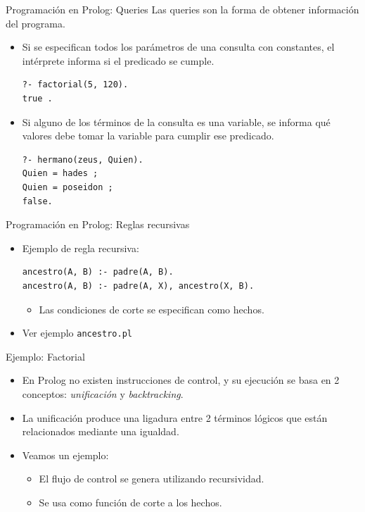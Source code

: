 \documentclass[xcolor=dvipsnames]{beamer}
\begin{document}
\begin{frame}[fragile]{Programación en Prolog: Queries}
    Las queries son la forma de obtener información del programa.
    \begin{itemize}
        \item Si se especifican todos los parámetros de una consulta con constantes, el intérprete informa si el predicado se cumple.
        \begin{lstlisting}
?- factorial(5, 120).
true .
        \end{lstlisting} 
        \item Si alguno de los términos de la consulta es una variable, se informa qué valores debe tomar la variable para cumplir ese predicado.
        \begin{lstlisting}
?- hermano(zeus, Quien).
Quien = hades ;
Quien = poseidon ;
false.
        \end{lstlisting} 
    \end{itemize}
\end{frame}

\begin{frame}[fragile]{Programación en Prolog: Reglas recursivas}
    \begin{itemize}
        \item Ejemplo de regla recursiva:
        \begin{lstlisting}
ancestro(A, B) :- padre(A, B).
ancestro(A, B) :- padre(A, X), ancestro(X, B).
        \end{lstlisting} 
        \begin{itemize}
            \item Las condiciones de corte se especifican como hechos.
        \end{itemize}
        \item Ver ejemplo \verb|ancestro.pl|
    \end{itemize}
\end{frame}

\begin{frame}[fragile]{Ejemplo: Factorial}
 
\begin{itemize}
 \item En Prolog no existen instrucciones de control, y su ejecución se basa en 2 conceptos: \textit{unificación} y \textit{backtracking}. 
 \item La unificación produce una ligadura entre 2 términos lógicos que están relacionados mediante una igualdad.
 \item Veamos un ejemplo:

\begin{itemize}
 \item El flujo de control se genera utilizando recursividad.
 \item Se usa como función de corte a los hechos. 
\end{itemize}
\end{itemize}

\end{frame}
 
\end{document}

